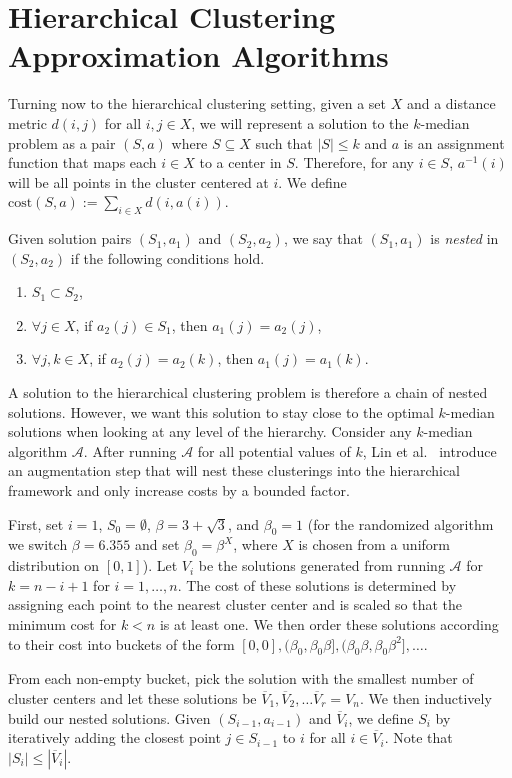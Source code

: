 \documentclass{article}
\begin{document}
\section{Hierarchical Clustering Approximation Algorithms}
Turning now to the hierarchical clustering setting, given a set $X$ and a distance metric $d(i,j)$ for all $i,j \in X$, we will represent a solution to the $k$-median problem as a pair $(S, a)$ where $S \subseteq X$ such that $|S| \leq k$ and $a$ is an assignment function that maps each $i \in X$ to a center in $S$. Therefore, for any $i \in S$, $a^{-1}(i)$ will be all points in the cluster centered at $i$. We define $\mathrm{cost}(S,a) := \sum_{i \in X} d(i, a(i))$.

Given solution pairs $(S_1, a_1)$ and $(S_2, a_2)$, we say that $(S_1, a_1)$ is \emph{nested} in $(S_2, a_2)$ if the following conditions hold.
\begin{enumerate}
	\item $S_1 \subset S_2$, 
	\item $\forall  j \in X$, if $a_2(j) \in S_1$, then $a_1(j) = a_2(j)$, 
	\item $\forall j, k \in X$, if $a_2(j) = a_2(k)$, then $a_1(j) = a_1(k)$.
\end{enumerate}
 A solution to the hierarchical clustering problem is therefore a chain of nested solutions. However, we want this solution to stay close to the optimal $k$-median solutions when looking at any level of the hierarchy.  
Consider any $k$-median algorithm $\mathcal{A}$. After running $\mathcal{A}$ for all potential values of $k$, Lin et al.~\cite{Lin} introduce an augmentation step that will nest these clusterings into the hierarchical framework and only increase costs by a bounded factor. 

First, set $i=1$, $S_0 = \emptyset$, $\beta = 3+\sqrt{3}$, and $\beta_0 = 1$ (for the randomized algorithm we switch $\beta = 6.355$ and set $\beta_0 = \beta^X$, where $X$ is chosen from a uniform distribution on $[0,1]$). Let $V_i$ be the solutions generated from running $\mathcal{A}$ for $k=n-i+1$ for $i=1, \ldots, n$. The cost of these solutions is determined by assigning each point to the nearest cluster center and is scaled so that the minimum cost for $k<n$ is at least one. We then order these solutions according to their cost into buckets of the form $[0,0], (\beta_0, \beta_0 \beta], (\beta_0 \beta, \beta_0 \beta^2], \ldots $. 

From each non-empty bucket, pick the solution with the smallest number of cluster centers and let these solutions be $\overline{V}_1, \overline{V}_2, \ldots \overline{V}_r = V_n$. We then inductively build our nested solutions. Given $(S_{i-1}, a_{i-1})$ and $\overline{V}_i$, we define $S_i$ by iteratively adding the closest point $j \in S_{i-1}$ to $i$ for all $i \in \overline{V}_i$. Note that $|S_{i}| \leq |\overline{V}_i|$. 
\end{document}
